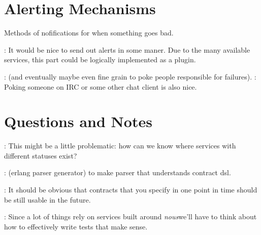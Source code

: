 \documentclass[12pt,twoside]{article}
\newcommand{\projectname}[0]{\textit{nous}}
\begin{document}
\section{Alerting Mechanisms}
Methods of nofifications for when something goes bad.
\begin{itemize}
  : It would be nice to send out
    alerts in some maner. Due to the many available services, this
    part could be logically implemented as a plugin.
  \begin{itemize}
    : (and eventually maybe even fine grain to
      poke people responsible for failures).
    : Poking someone on IRC or some
      other chat client is also nice.
  \end{itemize}
\end{itemize}

\section{Questions and Notes}
\begin{itemize}
  : This might be a little problematic: how can
    we know where services with different statuses exist?

  : (erlang parser generator) to make parser that
    understands contract dsl.

  : It should be obvious that
    contracts that you specify in one point in time should be still
    usable in the future.

  : Since a lot of things rely on services
    built around \projectname we'll have to think about how to
    effectively write tests that make sense.
\end{itemize}
\end{document}
